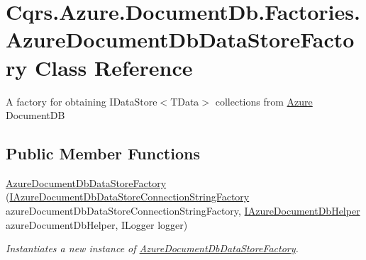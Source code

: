 \hypertarget{classCqrs_1_1Azure_1_1DocumentDb_1_1Factories_1_1AzureDocumentDbDataStoreFactory}{}\section{Cqrs.\+Azure.\+Document\+Db.\+Factories.\+Azure\+Document\+Db\+Data\+Store\+Factory Class Reference}
\label{classCqrs_1_1Azure_1_1DocumentDb_1_1Factories_1_1AzureDocumentDbDataStoreFactory}


A factory for obtaining I\+Data\+Store$<$\+T\+Data$>$ collections from \hyperlink{namespaceCqrs_1_1Azure}{Azure} Document\+DB  


\subsection*{Public Member Functions}
\begin{DoxyCompactItemize}
\item 
\hyperlink{classCqrs_1_1Azure_1_1DocumentDb_1_1Factories_1_1AzureDocumentDbDataStoreFactory_a7bafe0acfcbb5eaacb5cd2714c39fa08_a7bafe0acfcbb5eaacb5cd2714c39fa08}{Azure\+Document\+Db\+Data\+Store\+Factory} (\hyperlink{interfaceCqrs_1_1Azure_1_1DocumentDb_1_1Factories_1_1IAzureDocumentDbDataStoreConnectionStringFactory}{I\+Azure\+Document\+Db\+Data\+Store\+Connection\+String\+Factory} azure\+Document\+Db\+Data\+Store\+Connection\+String\+Factory, \hyperlink{interfaceCqrs_1_1Azure_1_1DocumentDb_1_1IAzureDocumentDbHelper}{I\+Azure\+Document\+Db\+Helper} azure\+Document\+Db\+Helper, I\+Logger logger)
\begin{DoxyCompactList}\small\item\em Instantiates a new instance of \hyperlink{classCqrs_1_1Azure_1_1DocumentDb_1_1Factories_1_1AzureDocumentDbDataStoreFactory}{Azure\+Document\+Db\+Data\+Store\+Factory}. \end{DoxyCompactList}\end{DoxyCompactItemize}
